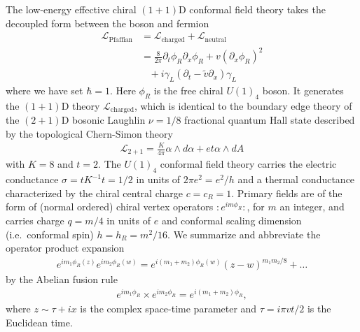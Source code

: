 The low-energy effective chiral $(1+1)$D conformal field theory takes the decoupled form between the boson and fermion \begin{align}\mathcal{L}_{\mathrm{Pfaffian}}&=\mathcal{L}_{\mathrm{charged}}+\mathcal{L}_{\mathrm{neutral}}\label{Pfaffian}\\&=\frac{8}{2\pi}\partial_t\phi_R\partial_x\phi_R+v(\partial_x\phi_R)^2\nonumber\\&\;\;\;+i\gamma_L(\partial_t-\tilde{v}\partial_x)\gamma_L\nonumber\end{align} where we have set $\hbar=1$. Here $\phi_R$ is the free chiral $U(1)_4$ boson. It generates the $(1+1)$D theory $\mathcal{L}_{\mathrm{charged}}$, which is identical to the boundary edge theory of the $(2+1)$D bosonic Laughlin $\nu=1/8$ fractional quantum Hall state described by the topological Chern-Simon theory~\cite{WenZee92,Wenedgereview} \begin{align}\mathcal{L}_{2+1}=\frac{K}{4\pi}\alpha\wedge d\alpha+et\alpha\wedge dA\label{LFQHCS}\end{align} with $K=8$ and $t=2$. The $U(1)_4$ conformal field theory carries the electric conductance $\sigma=tK^{-1}t=1/2$ in units of $2\pi e^2=e^2/h$ and a thermal conductance characterized by the chiral central charge $c=c_R=1$. Primary fields are of the form of (normal ordered) chiral vertex operators $:e^{im\phi_R}:$, for $m$ an integer, and carries charge $q=m/4$ in units of $e$ and conformal scaling dimension (i.e.~conformal spin) $h=h_R=m^2/16$. We summarize and abbreviate the operator product expansion \begin{align}e^{im_1\phi_R(z)}e^{im_2\phi_R(w)}=e^{i(m_1+m_2)\phi_R(w)}(z-w)^{m_1m_2/8}+\ldots\end{align} by the Abelian fusion rule \begin{align}e^{im_1\phi_R}\times e^{im_2\phi_R}=e^{i(m_1+m_2)\phi_R},\end{align} where $z\sim\tau+ix$ is the complex space-time parameter and $\tau=i\pi vt/2$ is the Euclidean time.

